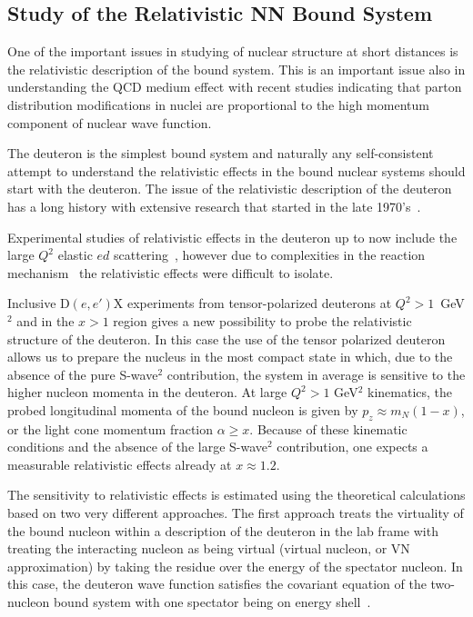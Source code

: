 \subsection{Study of the Relativistic NN Bound System}

One of the important issues in studying of nuclear structure  at short distances is the 
relativistic description of the bound system.  This is an important issue also in 
understanding the QCD medium effect with recent studies indicating that  parton distribution 
modifications  in nuclei are proportional to the high momentum component of nuclear wave function.

The deuteron is the simplest bound system and naturally any self-consistent attempt  to understand the 
relativistic effects in the bound nuclear systems  should start with the deuteron. 
The issue of the relativistic description of the deuteron has a long history with extensive research that started in the late 1970's~\cite{Gross:1982nz,Buck:1979ff,Frankfurt:1977vc,Frankfurt:1981mk}.

Experimental studies of relativistic effects in the deuteron  up to now include the large $Q^2$ elastic 
$ed$ scattering~\cite{Alexa:1998fe}, however  
due to complexities  in the reaction mechanism~\cite{VanOrden:1995eg} the relativistic effects were 
difficult to isolate.

Inclusive D$(e,e')$X experiments from tensor-polarized deuterons at  $Q^2>1$~GeV$^2$ and in the $x>1$ region gives 
a new possibility to probe the relativistic structure of the deuteron.  In this case the use of the tensor polarized
deuteron allows us to prepare the nucleus in the most compact state in which, due to the absence of the 
pure S-wave$^2$ contribution, the system in average is sensitive to the higher nucleon momenta in the deuteron.
At large $Q^2>1$ GeV$^2$ kinematics, the probed longitudinal momenta of the bound nucleon is given by $p_z \approx m_N(1-x)$, 
or the light cone momentum fraction $\alpha \ge x$. Because of these kinematic conditions and the absence of the 
large S-wave$^2$ contribution, one expects a measurable relativistic effects already at $x\approx 1.2$.  


The sensitivity to relativistic effects is estimated using the theoretical calculations based on two 
very different approaches.   The first approach treats the  virtuality of the bound nucleon within a
description of the deuteron in the lab frame  with treating the interacting nucleon as being 
virtual (virtual nucleon, or VN approximation) 
by taking the residue over the energy of the spectator nucleon.
In this case, the deuteron wave function satisfies the covariant equation of the two-nucleon bound system 
with one spectator being on energy shell~\cite{Sargsian:2009hf,Gross:2010qm}.

